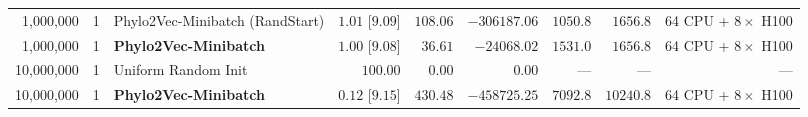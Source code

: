 \begin{table}[!htbp]
{\begin{tabular}{@{}rrlrrrrrr@{}}
1,000,000 & 1 & Phylo2Vec-Minibatch (RandStart) & $1.01$ [$9.09$] & $108.06$ & $-306187.06$ & $\mathbf{1050.8}$ & $\mathbf{1656.8}$ & 64 CPU + $8\times$ H100\\
1,000,000 & 1 & \textbf{Phylo2Vec-Minibatch} & $\mathbf{1.00}$ [$\mathbf{9.08}$] & $\mathbf{36.61}$ & $-24068.02$ & $1531.0$ & $\mathbf{1656.8}$ & 64 CPU + $8\times$ H100\\
\midrule
10,000,000 & 1 & Uniform Random Init & $100.00$ & $0.00$ & $0.00$ & --- & --- & ---\\
10,000,000 & 1 & \textbf{Phylo2Vec-Minibatch} & $\mathbf{0.12}$ [$\mathbf{9.15}$] & $\mathbf{430.48}$ & $-458725.25$ & $\mathbf{7092.8}$ & $10240.8$ & 64 CPU + $8\times$ H100\\
\bottomrule
\end{tabular}%
}
\end{table}

